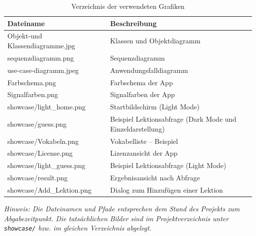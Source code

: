 \documentclass[12pt,a4paper]{article}
\begin{document}
\begin{table}[htbp]
\centering
\caption{Verzeichnis der verwendeten Grafiken}
\begin{tabularx}{\textwidth}{ll}
\toprule
\textbf{Dateiname} & \textbf{Beschreibung} \\
\midrule
Objekt-und Klassendiagramme.jpg & Klassen und Objektdiagramm \\
sequenzdiagramm.png & Sequenzdiagramm \\
use-case-diagramm.jpeg & Anwendungsfalldiagramm \\
Farbschema.png & Farbschema der App \\
Signalfarben.png & Signalfarben der App \\
showcase/light\_home.png & Startbildschirm (Light Mode) \\
showcase/guess.png & Beispiel Lektionsabfrage (Dark Mode und Einzeldarstellung) \\
showcase/Vokabeln.png & Vokabelliste – Beispiel \\
showcase/License.png & Lizenzansicht der App \\
showcase/light\_guess.png & Beispiel Lektionsabfrage (Light Mode) \\
showcase/result.png & Ergebnisansicht nach Abfrage \\
showcase/Add\_Lektion.png & Dialog zum Hinzufügen einer Lektion \\
\bottomrule
\end{tabularx}
\end{table}

\textit{Hinweis: Die Dateinamen und Pfade entsprechen dem Stand des Projekts zum Abgabezeitpunkt. Die tatsächlichen Bilder sind im Projektverzeichnis unter \texttt{showcase/} bzw. im gleichen Verzeichnis abgelegt.}
\end{document}
